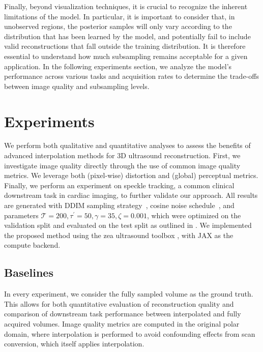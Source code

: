 \documentclass[journal,twoside,web,dvipsnames]{ieeecolor}          %
\begin{document}
Finally, beyond visualization techniques, it is crucial to recognize the inherent limitations of the model. In particular, it is important to consider that, in unobserved regions, the posterior samples will only vary according to the distribution that has been learned by the model, and potentially fail to include valid reconstructions that fall outside the training distribution. It is therefore  essential to understand how much subsampling remains acceptable for a given application. In the following experiments section, we analyze the model’s performance across various tasks and acquisition rates to determine the trade-offs between image quality and subsampling levels.

\section{Experiments}
We perform both qualitative and quantitative analyses to assess the benefits of advanced interpolation methods for 3D ultrasound reconstruction. First, we investigate image quality directly through the use of common image quality metrics. We leverage both (pixel-wise) distortion and (global) perceptual metrics. Finally, we perform an experiment on speckle tracking, a common clinical downstream task in cardiac imaging, to further validate our approach. All results are generated with DDIM sampling strategy~\cite{song2020denoising}, cosine noise schedule~\cite{nichol2021improved}, and parameters $\mathcal{T}=200, \tau^\prime=50, \gamma=35, \zeta=0.001$, which were optimized on the validation split and evaluated on the test split as outlined in . We implemented the proposed method using the zea ultrasound toolbox \cite{zea2025}, with JAX as the compute backend.

\subsection{Baselines}
In every experiment, we consider the fully sampled volume as the ground truth. This allows for both quantitative evaluation of reconstruction quality and comparison of downstream task performance between interpolated and fully acquired volumes. Image quality metrics are computed in the original polar domain, where interpolation is performed to avoid confounding effects from scan conversion, which itself applies interpolation.
\end{document}
